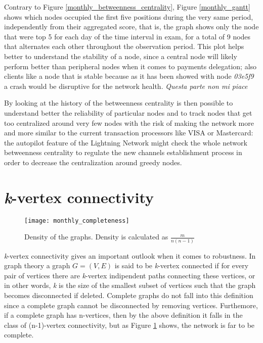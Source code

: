 	Contrary to Figure \ref{monthly_betweenness_centrality}, Figure \ref{monthly_gantt} shows which nodes occupied the first five positions during the very same period, independently from their aggregated score, that is, the graph shows only the node that were top 5 for each day of the time interval in exam, for a total of 9 nodes that alternates each other throughout the observation period. This plot helps better to understand the stability of a node, since a central node will likely perform better than peripheral nodes when it comes to payments delegation; also clients like a node that is stable because as it has been showed with node \textit{03e5f9} a crash would be disruptive for the network health. \textit{Questa parte non mi piace}
	
	By looking at the history of the betweenness centrality is then possible to understand better the reliability of particular nodes and to track nodes that get too centralized around very few nodes with the risk of making the network more and more similar to the current transaction processors like VISA or Mastercard: the autopilot feature of the Lightning Network might check the whole network betweenness centrality to regulate the new channels establishment process in order to decrease the centralization around greedy nodes. 
	
	\newpage
	
	\section{\textit{k}-vertex connectivity}

	\begin{figure}
		\texttt{[image: monthly\_completeness]}
		\caption{Density of the graphs. Density is calculated as $\frac{m}{n(n-1)}$}
		\label{monthly_completeness}
	\end{figure}
	
	\textit{k}-vertex connectivity gives an important outlook when it comes to robustness. In graph theory a graph $G = (V,E)$ is said to be \textit{k}-vertex connected if for every pair of vertices there are \textit{k}-vertex indipendent paths connecting these vertices, or in other words, \textit{k} is the size of the smallest subset of vertices such that the graph becomes disconnected if deleted. Complete graphs do not fall into this definition since a complete graph cannot be disconnected by removing vertices. Furthemore, if a complete graph has n-vertices, then by the above definition it falls in the class of (n-1)-vertex connectivity, but as Figure \ref{monthly_completeness} shows, the network is far to be complete.

